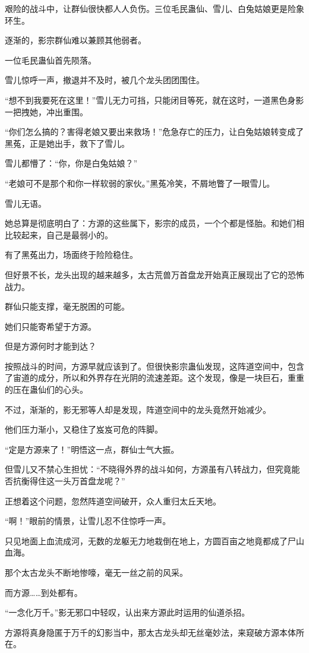 \begin{this_body}
艰险的战斗中，让群仙很快都人人负伤。三位毛民蛊仙、雪儿、白兔姑娘更是险象环生。

逐渐的，影宗群仙难以兼顾其他弱者。

一位毛民蛊仙首先陨落。

雪儿惊呼一声，撤退并不及时，被几个龙头团团围住。

“想不到我要死在这里！”雪儿无力可挡，只能闭目等死，就在这时，一道黑色身影一把拽她，冲出重围。

“你们怎么搞的？害得老娘又要出来救场！”危急存亡的压力，让白兔姑娘转变成了黑菟，正是她出手，救下了雪儿。

雪儿都懵了：“你，你是白兔姑娘？”

“老娘可不是那个和你一样软弱的家伙。”黑菟冷笑，不屑地瞥了一眼雪儿。

雪儿无语。

她总算是彻底明白了：方源的这些属下，影宗的成员，一个个都是怪胎。和她们相比较起来，自己是最弱小的。

有了黑菟出力，场面终于险险稳住。

但好景不长，龙头出现的越来越多，太古荒兽万首盘龙开始真正展现出了它的恐怖战力。

群仙只能支撑，毫无脱困的可能。

她们只能寄希望于方源。

但是方源何时才能到达？

按照战斗的时间，方源早就应该到了。但很快影宗蛊仙发现，这阵道空间中，包含了宙道的成分，所以和外界存在光阴的流速差距。这个发现，像是一块巨石，重重的压在蛊仙们的心头。

不过，渐渐的，影无邪等人却是发现，阵道空间中的龙头竟然开始减少。

他们压力渐小，又稳住了岌岌可危的阵脚。

“定是方源来了！”明悟这一点，群仙士气大振。

但雪儿又不禁心生担忧：“不晓得外界的战斗如何，方源虽有八转战力，但究竟能否抗衡得住这一头万首盘龙呢？”

正想着这个问题，忽然阵道空间破开，众人重归太丘天地。

“啊！”眼前的情景，让雪儿忍不住惊呼一声。

只见地面上血流成河，无数的龙躯无力地栽倒在地上，方圆百亩之地竟都成了尸山血海。

那个太古龙头不断地惨嚎，毫无一丝之前的风采。

而方源……到处都有。

“一念化万千。”影无邪口中轻叹，认出来方源此时运用的仙道杀招。

方源将真身隐匿于万千的幻影当中，那太古龙头却无丝毫妙法，来窥破方源本体所在。


\end{this_body}
